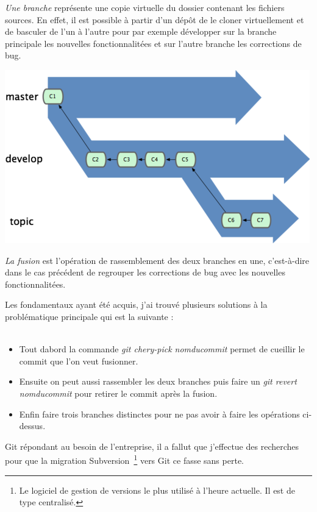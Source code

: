 \emph{Une branche} représente une \og copie virtuelle \fg{} du dossier contenant
les fichiers sources. En effet, il est possible à partir d'un dépôt de le
cloner virtuellement et de basculer de l'un à l'autre pour par exemple
développer sur la branche principale les nouvelles fonctionnalitées et sur
l'autre branche les corrections de bug.

\begin{center}
\includegraphics{images/branches.png}
\end{center}

\emph{La fusion} est l'opération de rassemblement des deux branches en une,
c'est-à-dire dans le cas précédent de regrouper les corrections de bug avec les
nouvelles fonctionnalitées.

Les fondamentaux ayant été acquis, j'ai trouvé plusieurs solutions à la
problématique principale qui est la suivante :\\ \\

\begin{itemize}
    \item Tout dabord la commande \emph{git chery-pick \og nomducommit \fg{}}
        permet de \og cueillir \fg{} le commit que l'on veut fusionner.
    \item Ensuite on peut aussi rassembler les deux branches puis faire un
        \emph{git revert \og nomducommit \fg{}} pour retirer le commit après la
        fusion.
    \item Enfin faire trois branches distinctes pour ne pas avoir à faire les
        opérations ci-dessus.
\end{itemize}

Git répondant au besoin de l'entreprise, il a fallut que j'effectue des
recherches pour que la migration Subversion\, \footnote{Le logiciel de gestion
de versions le plus utilisé à l’heure actuelle. Il est de type centralisé.}
vers Git ce fasse sans perte.

